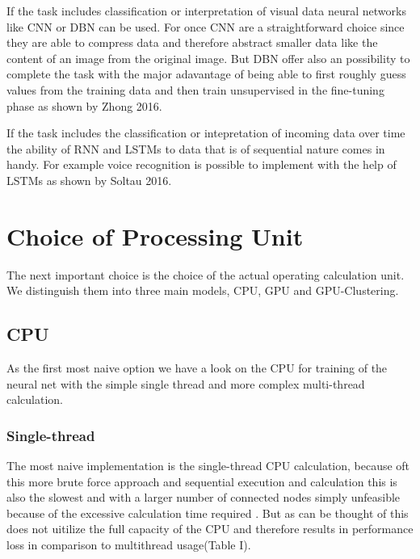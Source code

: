 \documentclass[conference]{IEEEtran}
\begin{document}
If the task includes classification or interpretation of visual data neural networks like CNN or DBN can be used. For once CNN are a straightforward choice since they are able to compress data and therefore abstract smaller data like the content of an image from the original image. But DBN offer also an possibility to complete the task with the major adavantage of being able to first roughly guess values from the training data and then train unsupervised in the fine-tuning phase as shown by Zhong 2016\cite{zhong2016diversified}.

If the task includes the classification or intepretation of incoming data over time the ability of RNN and LSTMs to data that is of sequential nature comes in handy. For example voice recognition is possible to implement with the help of LSTMs as shown by Soltau 2016\cite{soltau2016neural}.






\section{Choice of Processing Unit}
The next important choice is the choice of the actual operating calculation unit. We distinguish them into three main models, CPU, GPU and GPU-Clustering.
\subsection{CPU}
As the first most naive option we have a look on the CPU for training of the neural net with the simple single thread and more complex multi-thread calculation.
\subsubsection{Single-thread}
The most naive implementation is the single-thread CPU calculation, because oft this more  brute force approach and sequential execution and calculation this is also the slowest and with a larger number of connected nodes simply unfeasible because of the excessive calculation time required . But as can be thought of this does not uitilize the full capacity of the CPU and therefore results in performance loss in comparison to multithread usage(Table I).
\end{document}
